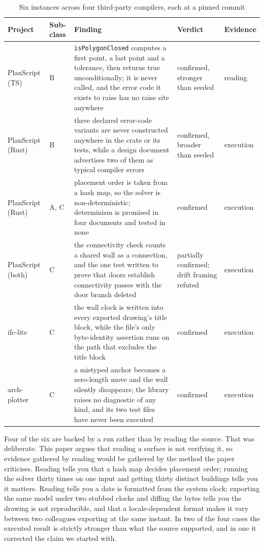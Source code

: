 \documentclass[10pt,journal,compsoc]{IEEEtran}
\begin{document}
\begin{table}[t]
\caption{Six instances across four third-party compilers, each at a pinned commit}
\label{tab:corrob}
\centering\footnotesize
\begin{tabular}{@{}llp{}ll@{}}
\toprule
\textbf{Project} & \textbf{Sub-class} & \textbf{Finding} & \textbf{Verdict} & \textbf{Evidence} \\
\midrule
PlanScript (TS) & B &
\texttt{isPolygonClosed} computes a first point, a last point and a tolerance, then returns
true unconditionally; it is never called, and the error code it exists to raise has no raise
site anywhere & confirmed, stronger than seeded & reading \\
\addlinespace
PlanScript (Rust) & B &
three declared error-code variants are never constructed anywhere in the crate or its tests,
while a design document advertises two of them as typical compiler errors & confirmed, broader
than seeded & execution \\
\addlinespace
PlanScript (Rust) & A, C &
placement order is taken from a hash map, so the solver is non-deterministic; determinism is
promised in four documents and tested in none & confirmed & execution \\
\addlinespace
PlanScript (both) & C &
the connectivity check counts a shared wall as a connection, and the one test written to prove
that doors establish connectivity passes with the door branch deleted & partially confirmed;
drift framing refuted & execution \\
\addlinespace
ifc-lite & C &
the wall clock is written into every exported drawing's title block, while the file's only
byte-identity assertion runs on the path that excludes the title block & confirmed & execution \\
\addlinespace
arch-plotter & C &
a mistyped anchor becomes a zero-length move and the wall silently disappears; the library
raises no diagnostic of any kind, and its two test files have never been executed & confirmed
& execution \\
\bottomrule
\end{tabular}
\end{table}

Four of the six are backed by a run rather than by reading the source. That was deliberate.
This paper argues that reading a surface is not verifying it, so evidence gathered by reading
would be gathered by the method the paper criticises. Reading tells you that a hash map decides
placement order; running the solver thirty times on one input and getting thirty distinct
buildings tells you it matters. Reading tells you a date is formatted from the system clock;
exporting the same model under two stubbed clocks and diffing the bytes tells you the drawing
is not reproducible, and that a locale-dependent format makes it vary between two colleagues
exporting at the same instant. In two of the four cases the executed result is strictly
stronger than what the source supported, and in one it corrected the claim we started with.
\end{document}

